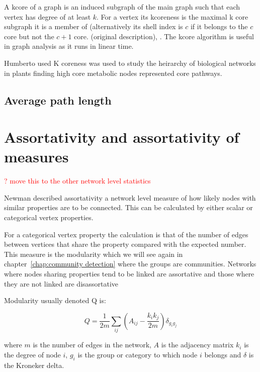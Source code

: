 A kcore of a graph is an induced subgraph of the main graph such that each vertex has degree of at least $k$. For a vertex its kcoreness is the maximal k core subgraph it is a member of (alternatively its shell index is $c$ if it belongs to the $c$ core but not the $c+1$ core. \cite{seidman1983network} (original description), \cite{alvarez2006large}. The kcore algorithm is useful in graph analysis as it runs in linear time. 

Humberto used K coreness was used to study the heirarchy of biological networks in plants \cite{humberto2018hierarchical} finding high core metabolic nodes represented core pathways. 

\subsection{Average path length}
\label{sec:Centrality intro average path length}

\section{Assortativity and assortativity of measures}
\label{sec:assortativity}
\textcolor{red}{? move this to the other network level statistics}

Newman described assortativity a network level measure of how likely nodes with similar properties are to be connected. \cite{newman2002assortative} This can be calculated by either scalar or categorical vertex properties.

For a categorical vertex property the calculation is that of the number of edges between vertices that share the property compared with the expected number. This measure is the modularity which we will see again in chapter~\ref{chap:community detection} where the groups are communities. Networks where nodes sharing properties tend to be linked are assortative and those where they are not linked are disassortative

Modularity usually denoted Q is:

\begin{equation}
    Q = \frac{1}{2m}\sum_{ij}(A_{ij}-\frac{k_ik_j}{2m})\delta_{g_ig_j}
\end{equation}

where $m$ is the number of edges in the network, $A$ is the adjacency matrix $k_i$ is the degree of node $i$, $g_i$ is the group or category to which node $i$ belongs and $\delta$ is the Kroneker delta. 

